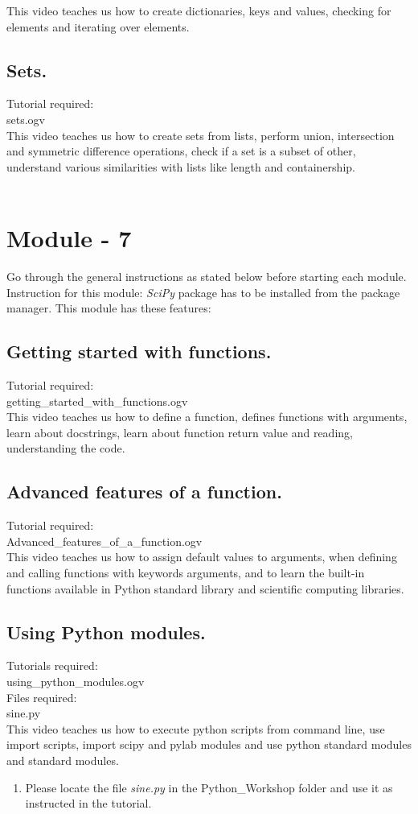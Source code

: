 \documentclass[11pt,twocolumn]{article}
\newenvironment{enumcpt}{\begin{enumerate} \topsep 0pt \partopsep 0pt 
                        \parsep 0pt
                        \itemsep 0pt \leftmargin -1in \rightmargin 0pt
                        }{\end{enumerate}}
\begin{document}
This video teaches us how to create dictionaries, keys and values, checking for elements and iterating over elements. 
\subsection{Sets.}
Tutorial required: \\sets.ogv \\

This video teaches us how to create sets from lists, perform union, intersection and symmetric difference operations, check if a set is a subset of other, understand various similarities with lists like length and containership.\\ \\


\section{Module - 7}
Go through the general instructions as stated below before starting each module.
Instruction for this module: \emph{SciPy} package has to be installed from the package manager. 
This module has these features:
\subsection{Getting started with functions.}
Tutorial required:\\getting\_started\_with\_functions.ogv \\
This video teaches us how to define a function, defines functions with arguments, learn about docstrings, learn about function return value and reading, understanding the code.
\subsection{Advanced features of a function.}
Tutorial required:\\Advanced\_features\_of\_a\_function.ogv \\

This video teaches us how to assign default values to arguments, when defining and calling functions with keywords arguments, and to learn the built-in functions available in Python standard  library and scientific computing libraries. 
\subsection{Using Python modules.}
 Tutorials required:\\using\_python\_modules.ogv \\
 Files required: \\sine.py \\
This video teaches us how to execute python scripts from command line, use import scripts, import scipy and pylab modules and use python standard modules and standard modules.
\begin{enumcpt}
\item Please locate the file \emph{sine.py} in the Python\_Workshop folder and use it as instructed in the tutorial.
\end{enumcpt}
\end{document}
